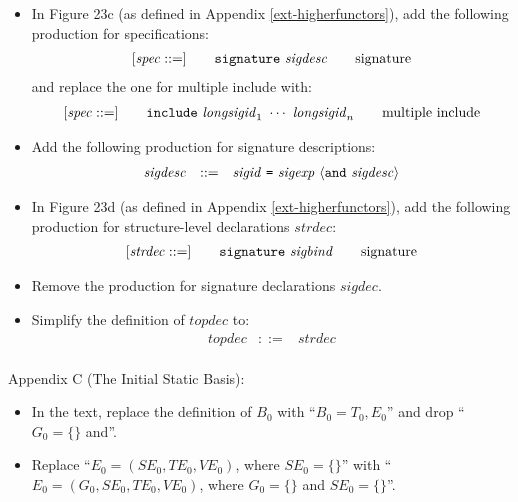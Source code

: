 \documentclass[twoside,titlepage]{article}
\begin{document}
\begin{appendix}
\begin{itemize}
\item In Figure 23c (as defined in Appendix \ref{ext-higherfunctors}), add the following production for specifications:
  $$
  \begin{array}{l@{\qquad}l@{\qquad}l}
  [\mathit{spec} ::=] & {\tt{signature}}~\mathit{sigdesc} & \textrm{signature} \\
  \end{array}
  $$
  and replace the one for multiple include with:
  $$
  \begin{array}{l@{\qquad}l@{\qquad}l}
  [\mathit{spec} ::=] & {\tt{include}}~\mathit{longsigid}_1~\cdots~\mathit{longsigid}_n & \textrm{multiple include} \\
  \end{array}
  $$

\item Add the following production for signature descriptions:
  $$
  \begin{array}{lll}
  \mathit{sigdesc} & ::= & \mathit{sigid}~\mbox{\tt=}~\mathit{sigexp}~\langle{\tt{and}}~\mathit{sigdesc}\rangle
  \end{array}
  $$

\item In Figure 23d (as defined in Appendix \ref{ext-higherfunctors}), add the following production for structure-level declarations $\mathit{strdec}$:
  $$
  \begin{array}{l@{\qquad}l@{\qquad}l}
  [\mathit{strdec} ::=] & {\tt{signature}}~\mathit{sigbind} & \textrm{signature} \\
  \end{array}
  $$

\item Remove the production for signature declarations $\mathit{sigdec}$.

\item Simplify the definition of $\mathit{topdec}$ to:
  $$
  \begin{array}{lll}
  \mathit{topdec} & ::= & \mathit{strdec} \\
  \end{array}
  $$
\end{itemize}

Appendix C (The Initial Static Basis):
\begin{itemize}
\item In the text, replace the definition of $B_0$ with ``$B_0 = T_0,E_0$'' and drop ``$G_0=\{\}$ and''.

\item Replace ``$E_0 = (\mathit{SE}_0,\mathit{TE}_0,\mathit{VE}_0)$, where $\mathit{SE}_0 = \{\}$'' with ``$E_0 = (G_0,\mathit{SE}_0,\mathit{TE}_0,\mathit{VE}_0)$, where $G_0 = \{\}$ and $\mathit{SE}_0 = \{\}$''.
\end{itemize}


\end{appendix}
\end{document}
